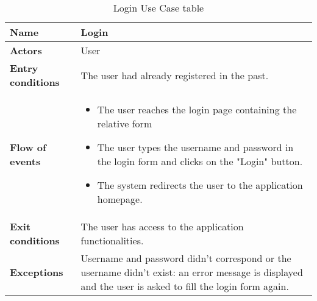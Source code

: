 \begin{table}[!htbp]
\centering
\begin{tabular}{lp{8cm}}
\bf\large Name&\bf\large Login\\
\hline
\hline
\bf Actors&User\\
\hline
\bf Entry conditions&The user had already registered in the past.\\
\hline
\bf Flow of events&
\begin{itemize}
\item The user reaches the login page containing the relative form
\item The user types the username and password in the login form and clicks on the "Login" button.
\item The system redirects the user to the application homepage.
\end{itemize}
\\
\hline
\bf Exit conditions&The user has access to the application functionalities. \\
\hline
\bf Exceptions&Username and password didn't correspond or the username didn't exist: an error message is displayed and the user is asked to fill the login form again.\\
\hline

\end{tabular}

\caption{Login Use Case table} \label{tab:login}
\end{table}